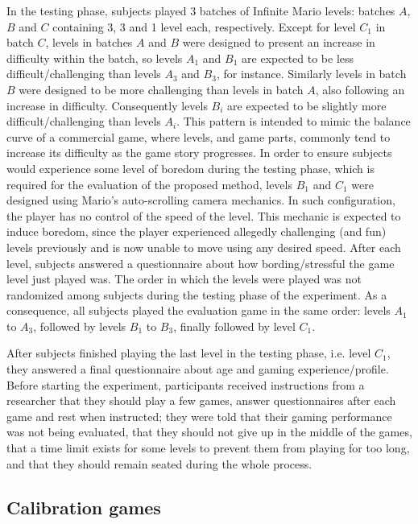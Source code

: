 In the testing phase, subjects played 3 batches of Infinite Mario levels: batches $A$, $B$ and $C$ containing 3, 3 and 1 level each, respectively. Except for level $C_1$ in batch $C$, levels in batches $A$ and $B$ were designed to present an increase in difficulty within the batch, so levels $A_1$ and $B_1$ are expected to be less difficult/challenging than levels $A_3$ and $B_3$, for instance. Similarly levels in batch $B$ were designed to be more challenging than levels in batch $A$, also following an increase in difficulty. Consequently levels $B_i$ are expected to be slightly more difficult/challenging than levels $A_i$. This pattern is intended to mimic the balance curve of a commercial game, where levels, and game parts, commonly tend to increase its difficulty as the game story progresses. In order to ensure subjects would experience some level of boredom during the testing phase, which is required for the evaluation of the proposed method, levels $B_1$ and $C_1$ were designed using Mario's auto-scrolling camera mechanics. In such configuration, the player has no control of the speed of the level. This mechanic is expected to induce boredom, since the player experienced allegedly challenging (and fun) levels previously and is now unable to move using any desired speed. After each level, subjects answered a questionnaire about how bording/stressful the game level just played was. The order in which the levels were played was not randomized among subjects during the testing phase of the experiment. As a consequence, all subjects played the evaluation game in the same order: levels $A_1$ to $A_3$, followed by levels $B_1$ to $B_3$, finally followed by level $C_1$.

After subjects finished playing the last level in the testing phase, i.e. level $C_1$, they answered a final questionnaire about age and gaming experience/profile. Before starting the experiment, participants received instructions from a researcher that they should play a few games, answer questionnaires after each game and rest when instructed; they were told that their gaming performance was not being evaluated, that they should not give up in the middle of the games, that a time limit exists for some levels to prevent them from playing for too long, and that they should remain seated during the whole process.

\subsection{Calibration games}
\label{sec:experiment2-calibration-games}

